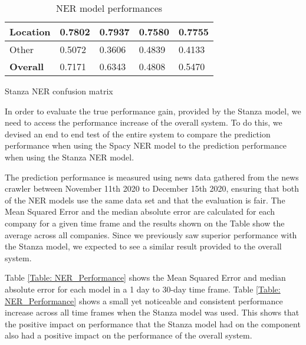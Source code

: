 \begin{table}[h]
\begin{subtable}{\textwidth}
\begin{tabular}{|l|l|l|l|l|}
                \hline
                Location             & {}{0.7802} & {}{0.7937} & {0.7580}                                    & {0.7755}                                     \\ 
                \hline
                Other                & {0.5072}                                     & {0.3606}                                    & {}{0.4839} & {0.4133}                                      \\ 
                \hline
                \textbf{Overall}     & {0.7171}                                    & {0.6343}                                    & {0.4808}                                    & {0.5470}                                     \\
                \hline
                \end{tabular}
                \caption{Stanza NER confusion matrix} \label{sub:stanza}
            \end{subtable}
            \smallskip
            \caption{NER model performances} \label{tab:eval_NER}
        \end{table}
        
        In order to evaluate the true performance gain, provided by the Stanza model, we need to access the performance increase of the overall system. To do this, we devised an end to end test of the entire system to compare the prediction performance when using the Spacy NER model to the prediction performance when using the Stanza NER model.
                
        The prediction performance is measured using news data gathered from the news crawler between November 11th 2020 to December 15th 2020, ensuring that both of the NER models use the same data set and that the evaluation is fair. The Mean Squared Error and the median absolute error are calculated for each company for a given time frame and the results shown on the Table show the average across all companies. Since we previously saw superior performance with the Stanza model, we expected to see a similar result provided to the overall system.
                
        Table \ref{Table: NER_Performance} shows the Mean Squared Error and median absolute error for each model in a 1 day to 30-day time frame. Table \ref{Table: NER_Performance} shows a small yet noticeable and consistent performance increase across all time frames when the Stanza model was used. This shows that the positive impact on performance that the Stanza model had on the component also had a positive impact on the performance of the overall system. 
                
